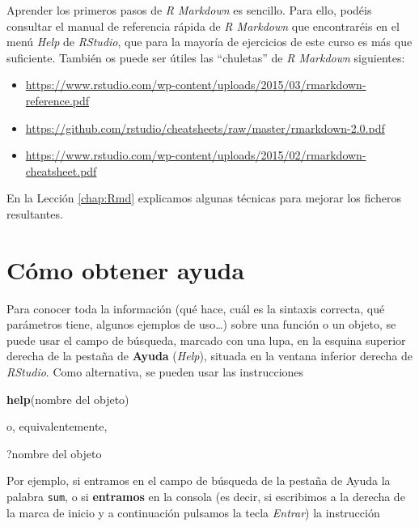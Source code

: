 \documentclass[]{book}
\newenvironment{Shaded}{\begin{snugshade}}{\end{snugshade}}
\newcommand{\KeywordTok}[1]{\textcolor[rgb]{0.13,0.29,0.53}{\textbf{#1}}}
\newcommand{\NormalTok}[1]{#1}
\theoremstyle{definition}
\theoremstyle{definition}
\theoremstyle{definition}
\theoremstyle{remark}
\begin{document}
Aprender los primeros pasos de \emph{R Markdown} es sencillo. Para ello, podéis consultar el manual de referencia rápida de \emph{R Markdown} que encontraréis en el menú \emph{Help} de \emph{RStudio}, que para la mayoría de ejercicios de este curso es más que suficiente.
También os puede ser útiles las ``chuletas'' de \emph{R Markdown} siguientes:

\begin{itemize}
\item
  \url{https://www.rstudio.com/wp-content/uploads/2015/03/rmarkdown-reference.pdf}
\item
  \url{https://github.com/rstudio/cheatsheets/raw/master/rmarkdown-2.0.pdf}
\item
  \url{https://www.rstudio.com/wp-content/uploads/2015/02/rmarkdown-cheatsheet.pdf}
\end{itemize}

En la Lección \ref{chap:Rmd} explicamos algunas técnicas para mejorar los ficheros resultantes.

\hypertarget{sec:help}{%
\section{Cómo obtener ayuda}\label{sec:help}}

Para conocer toda la información (qué hace, cuál es la sintaxis correcta, qué parámetros tiene, algunos ejemplos de uso\ldots{}) sobre una función o un objeto, se puede usar el campo de búsqueda, marcado con una lupa, en la esquina superior derecha de la pestaña de \textbf{Ayuda} (\emph{Help}), situada en la ventana inferior derecha de \emph{RStudio}. Como alternativa, se pueden usar las instrucciones

\begin{Shaded}
\begin{Highlighting}[]
\KeywordTok{help}\NormalTok{(nombre del objeto)}
\end{Highlighting}
\end{Shaded}

o, equivalentemente,

\begin{Shaded}
\begin{Highlighting}[]
\NormalTok{?nombre del objeto}
\end{Highlighting}
\end{Shaded}

Por ejemplo, si entramos en el campo de búsqueda de la pestaña de Ayuda la palabra \texttt{sum}, o si \textbf{entramos} en la consola (es decir, si escribimos a la derecha de la marca de inicio y a continuación pulsamos la tecla \emph{Entrar}) la instrucción
\end{document}
